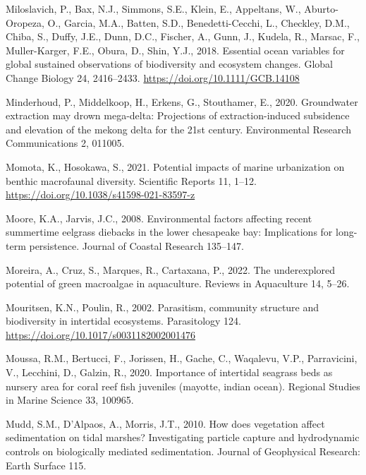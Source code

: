 \documentclass[
  letterpaper,
  11pt,
  english,
  singlespacing,
  headsepline]{MastersDoctoralThesis}
\newlength{\cslhangindent}
\newenvironment{CSLReferences}[2] %
 {\begin{list}{}{%
  \setlength{\itemindent}{0pt}
  \setlength{\leftmargin}{0pt}
  \setlength{\parsep}{0pt}
  \ifodd #1
   \setlength{\leftmargin}{\cslhangindent}
   \setlength{\itemindent}{-1\cslhangindent}
  \fi
  \setlength{\itemsep}{#2\baselineskip}}}
 {\end{list}}
\begin{document}
\begin{CSLReferences}{1}{0}
Miloslavich, P., Bax, N.J., Simmons, S.E., Klein, E., Appeltans, W.,
Aburto-Oropeza, O., Garcia, M.A., Batten, S.D., Benedetti-Cecchi, L.,
Checkley, D.M., Chiba, S., Duffy, J.E., Dunn, D.C., Fischer, A., Gunn,
J., Kudela, R., Marsac, F., Muller-Karger, F.E., Obura, D., Shin, Y.J.,
2018. Essential ocean variables for global sustained observations of
biodiversity and ecosystem changes. Global Change Biology 24,
2416--2433. \url{https://doi.org/10.1111/GCB.14108}

Minderhoud, P., Middelkoop, H., Erkens, G., Stouthamer, E., 2020.
Groundwater extraction may drown mega-delta: Projections of
extraction-induced subsidence and elevation of the mekong delta for the
21st century. Environmental Research Communications 2, 011005.

Momota, K., Hosokawa, S., 2021. {Potential impacts of marine
urbanization on benthic macrofaunal diversity}. Scientific Reports 11,
1--12. \url{https://doi.org/10.1038/s41598-021-83597-z}

Moore, K.A., Jarvis, J.C., 2008. Environmental factors affecting recent
summertime eelgrass diebacks in the lower chesapeake bay: Implications
for long-term persistence. Journal of Coastal Research 135--147.

Moreira, A., Cruz, S., Marques, R., Cartaxana, P., 2022. The
underexplored potential of green macroalgae in aquaculture. Reviews in
Aquaculture 14, 5--26.

Mouritsen, K.N., Poulin, R., 2002. {Parasitism, community structure and
biodiversity in intertidal ecosystems}. Parasitology 124.
\url{https://doi.org/10.1017/s0031182002001476}

Moussa, R.M., Bertucci, F., Jorissen, H., Gache, C., Waqalevu, V.P.,
Parravicini, V., Lecchini, D., Galzin, R., 2020. Importance of
intertidal seagrass beds as nursery area for coral reef fish juveniles
(mayotte, indian ocean). Regional Studies in Marine Science 33, 100965.

Mudd, S.M., D'Alpaos, A., Morris, J.T., 2010. How does vegetation affect
sedimentation on tidal marshes? Investigating particle capture and
hydrodynamic controls on biologically mediated sedimentation. Journal of
Geophysical Research: Earth Surface 115.


\end{CSLReferences}
\end{document}
